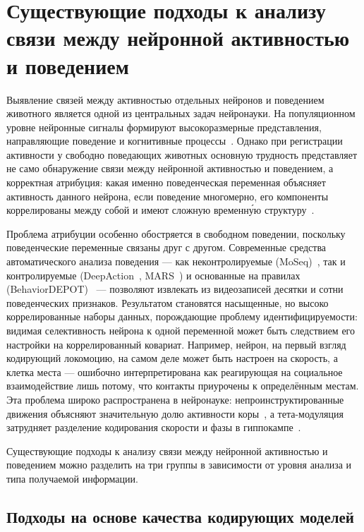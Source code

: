 \section{Существующие подходы к анализу связи между нейронной активностью и поведением}
\label{sec:behavior_encoding}

Выявление связей между активностью отдельных нейронов и поведением животного является одной из центральных задач нейронауки.
На популяционном уровне нейронные сигналы формируют высокоразмерные представления, направляющие поведение и когнитивные процессы~\cite{Averbeck2006}.
Однако при регистрации активности у свободно поведающих животных основную трудность представляет не само обнаружение связи между нейронной активностью и поведением, а корректная атрибуция: какая именно поведенческая переменная объясняет активность данного нейрона, если поведение многомерно, его компоненты коррелированы между собой и имеют сложную временн\'{у}ю структуру~\cite{Kriegeskorte2019}.

Проблема атрибуции особенно обостряется в свободном поведении, поскольку поведенческие переменные связаны друг с другом.
Современные средства автоматического анализа поведения --- как неконтролируемые (MoSeq)~\cite{Weinreb2024}, так и контролируемые (DeepAction~\cite{Harris2023deepaction}, MARS~\cite{Segalin2021}) и основанные на правилах (BehaviorDEPOT)~\cite{Gabriel2022} --- позволяют извлекать из видеозаписей десятки и сотни поведенческих признаков. Результатом становятся насыщенные, но высоко коррелированные наборы данных, порождающие проблему идентифицируемости: видимая селективность нейрона к одной переменной может быть следствием его настройки на коррелированный ковариат.
Например, нейрон, на первый взгляд кодирующий локомоцию, на самом деле может быть настроен на скорость, а клетка места --- ошибочно интерпретирована как реагирующая на социальное взаимодействие лишь потому, что контакты приурочены к определённым местам. Эта проблема широко распространена в нейронауке: непроинструктированные движения объясняют значительную долю активности коры~\cite{Musall2019}, а тета-модуляция затрудняет разделение кодирования скорости и фазы в гиппокампе~\cite{Vanderwolf1969, McNaughton1983}.

Существующие подходы к анализу связи между нейронной активностью и поведением можно разделить на три группы в зависимости от уровня анализа и типа получаемой информации.


\subsection{Подходы на основе качества кодирующих моделей}
\label{sec:decoding_approaches}

